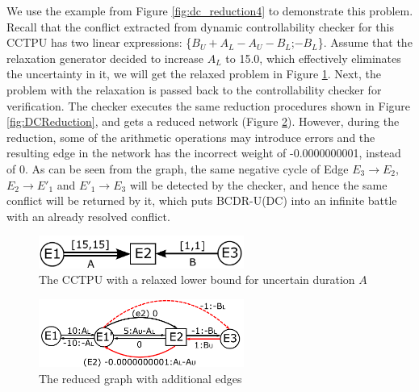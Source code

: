 \documentclass[jair,twoside,11pt,theapa]{article}
\begin{document}
We use the example from Figure \ref{fig:dc_reduction4} to demonstrate this problem.
Recall that the conflict extracted from dynamic controllability checker for this
CCTPU has two linear expressions: \{$B_U+A_L-A_U-B_L$;$-B_L$\}. Assume that the
relaxation generator decided to increase $A_L$ to 15.0, which effectively
eliminates the uncertainty in it, we will get the relaxed problem in Figure
\ref{fig:num_issue_1}. Next, the problem with the relaxation is passed back to
the controllability checker for verification. The checker executes the same
reduction procedures shown in Figure \ref{fig:DCReduction}, and gets a reduced
network (Figure \ref{fig:num_issue_2}). However, during the reduction, some of
the arithmetic operations may introduce errors and the resulting edge in the
network has the incorrect weight of -0.0000000001, instead of 0. As can be seen
from the graph, the same negative cycle of Edge $E_3\rightarrow
E_2$,$E_2\rightarrow E'_1$ and $E'_1\rightarrow E_3$ will be detected by the
checker, and hence the same conflict will be returned by it, which puts BCDR-U(DC)
into an infinite battle with an already resolved conflict.


\begin{figure}[htb]
	\centering
	\includegraphics[width=0.6\textwidth]{figures/numerical_issues/num_1.pdf}
	\caption{The CCTPU with a relaxed lower bound for uncertain duration $A$}
	\label{fig:num_issue_1}
\end{figure}


\begin{figure}[htb]
	\centering
	\includegraphics[width=0.6\textwidth]{figures/numerical_issues/num_2.pdf}
	\caption{The reduced graph with additional edges}
	\label{fig:num_issue_2}
\end{figure}
\end{document}
